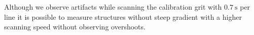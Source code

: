 \documentclass[paper=a4,fontsize=10pt,DIV=18,twocolumn,parskip=half]{scrartcl}
\numberwithin{equation}{section}    %
\begin{document}


Although we observe artifacts while scanning the calibration grit with  
$\SI{0.7}{\second}$ per line it is possible to measure structures without steep 
gradient with a higher scanning speed without observing overshoots.
\end{document}
